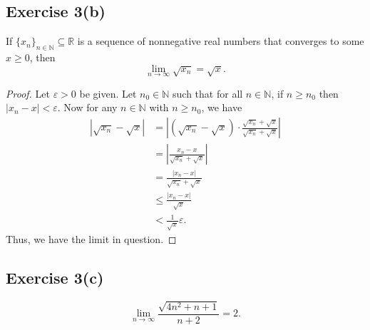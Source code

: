 \documentclass[12pt]{article}
\newenvironment{problem}
    {\begin{lrbox}{\mybox}\begin{minipage}{0.98\textwidth}}
    {\end{minipage}\end{lrbox}\framebox[\textwidth]{\usebox{\mybox}}}
\let\eps\varepsilon %
\newcommand{\N}{\mathbb{N}} %
\newcommand{\R}{\mathbb{R}} %
\newcommand{\<}{\left\langle} %
\renewcommand{\>}{\right\rangle} %
\begin{document}
\newpage
\subsection*{Exercise 3(b)}
\begin{problem}
    If $\{x_n\}_{n\in\N}\subseteq \R$ is a sequence of nonnegative real numbers that converges to some $x\ge 0$, then 
    \begin{equation}
        \lim_{n\to\infty}\sqrt{x_n} = \sqrt{x}.
    \end{equation}
\end{problem}

\begin{proof}
    Let $\eps>0$ be given. Let $n_0\in\N$ such that for all $n\in\N$, if $n\geq n_0$ then $|x_n-x|<\eps$. Now for any $n\in\N$ with $n\geq n_0$, we have
    \begin{align*}
        \left| \sqrt{x_n} - \sqrt{x} \right|
            &= \left| (\sqrt{x_n} - \sqrt{x}) \cdot \frac{\sqrt{x_n} + \sqrt{x}}{\sqrt{x_n} + \sqrt{x}}\right| \\
            &= \left| \frac{x_n - x}{\sqrt{x_n} + \sqrt{x}}\right| \\
            &= \frac{|x_n - x|}{\sqrt{x_n} + \sqrt{x}} \\
            &\leq \frac{|x_n - x|}{\sqrt{x}} \\
            &< \frac{1}{\sqrt{x}}\eps.
    \end{align*}
    Thus, we have the limit in question.

\end{proof}

\newpage
\subsection*{Exercise 3(c)}
\begin{problem}
    \begin{equation}
        \lim_{n\to \infty} \frac{\sqrt{4n^2+n+1}}{n+2} = 2.
    \end{equation}
\end{problem}
\end{document}
